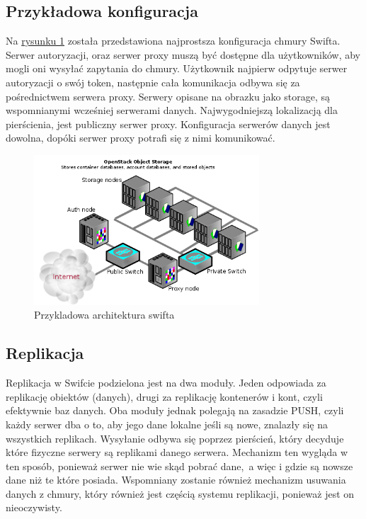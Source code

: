 \subsection{Przykładowa konfiguracja}\label{sub:przykladowa konfiguracja}

Na \hyperref[fig:swift_arch]{rysunku \ref{fig:swift_arch}} została przedstawiona najprostsza konfiguracja chmury Swifta. Serwer autoryzacji, oraz serwer proxy muszą być dostępne dla użytkowników, aby mogli oni wysyłać zapytania do chmury. Użytkownik najpierw odpytuje serwer autoryzacji o swój token, następnie cała komunikacja odbywa się za pośrednictwem serwera proxy. Serwery opisane na obrazku jako storage, są wspomnianymi wcześniej serwerami danych. Najwygodniejszą lokalizacją dla pierścienia, jest publiczny serwer proxy. Konfiguracja serwerów danych jest dowolna, dopóki serwer proxy potrafi się z nimi komunikować.

\begin{figure}
\centering
	\includegraphics[width=0.75\textwidth]{swift_install_arch.png}
	\caption{Przykladowa architektura swifta~\cite{swift_manual}}
\label{fig:swift_arch}
\end{figure}


\subsection{Replikacja}\label{sec:replikacja}

Replikacja w Swifcie podzielona jest na dwa moduły. Jeden odpowiada za replikację obiektów (danych), drugi za replikację kontenerów i kont, czyli efektywnie baz danych. Oba moduły jednak polegają na zasadzie PUSH, czyli każdy serwer dba o to, aby jego dane lokalne jeśli są nowe, znalazły się na wszystkich replikach. Wysyłanie odbywa się poprzez pierścień, który decyduje które fizyczne serwery są replikami danego serwera. Mechanizm ten wygląda w ten sposób, ponieważ serwer nie wie skąd pobrać dane,~a więc i gdzie są nowsze dane niż te które posiada. Wspomniany zostanie również mechanizm usuwania danych z chmury, który również jest częścią systemu replikacji, ponieważ jest on nieoczywisty. 

